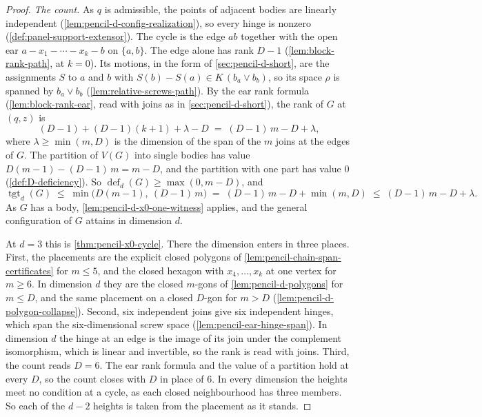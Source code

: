 \begin{proof}
  \emph{The count.} As $q$ is admissible, the points of adjacent bodies
  are linearly independent (\cref{lem:pencil-d-config-realization}), so
  every hinge is nonzero (\cref{def:panel-support-extensor}). The cycle
  is the edge $ab$ together with the open ear
  $a - x_1 - \cdots - x_k - b$ on $\{a, b\}$. The edge alone has rank
  $D - 1$ (\cref{lem:block-rank-path}, at $k = 0$). Its motions, in the
  form of \cref{sec:pencil-d-short}, are the assignments $S$ to $a$ and
  $b$ with $S(b) - S(a) \in K\,(b_a \vee b_b)$, so its space $\rho$ is
  spanned by $b_a \vee b_b$ (\cref{lem:relative-screws-path}). By the
  ear rank formula (\cref{lem:block-rank-ear}, read with joins as in
  \cref{sec:pencil-d-short}), the rank of $G$ at $(q, z)$ is
  \[
    (D - 1) + (D - 1)(k + 1) + \lambda - D \;=\; (D - 1)\,m - D + \lambda,
  \]
  where $\lambda \ge \min(m, D)$ is the dimension of the span of the $m$
  joins at the edges of $G$. The partition of $V(G)$ into single bodies
  has value $D(m - 1) - (D - 1)\,m = m - D$, and the partition with one
  part has value $0$ (\cref{def:D-deficiency}). So
  $\operatorname{def}_d(G) \ge \max(0, m - D)$, and
  \[
    \operatorname{tgt}_d(G) \;\le\; \min\bigl(D(m - 1),\ (D - 1)\,m\bigr)
    \;=\; (D - 1)\,m - D + \min(m, D) \;\le\; (D - 1)\,m - D + \lambda.
  \]
  As $G$ has a body, \cref{lem:pencil-d-x0-one-witness} applies, and the
  general configuration of $G$ attains in dimension $d$.

  At $d = 3$ this is \cref{thm:pencil-x0-cycle}. There the dimension
  enters in three places. First, the placements are the explicit closed
  polygons of \cref{lem:pencil-chain-span-certificates} for $m \le 5$,
  and the closed hexagon with $x_4, \dots, x_k$ at one vertex for
  $m \ge 6$. In dimension $d$ they are the closed $m$-gons of
  \cref{lem:pencil-d-polygons} for $m \le D$, and the same placement on
  a closed $D$-gon for $m > D$ (\cref{lem:pencil-d-polygon-collapse}).
  Second, six independent joins give six independent hinges, which span
  the six-dimensional screw space (\cref{lem:pencil-ear-hinge-span}). In
  dimension $d$ the hinge at an edge is the image of its join under the
  complement isomorphism, which is linear and invertible, so the rank is
  read with joins. Third, the count reads $D = 6$. The ear rank formula
  and the value of a partition hold at every $D$, so the count closes
  with $D$ in place of $6$. In every dimension the heights meet no
  condition at a cycle, as each closed neighbourhood has three members.
  So each of the $d - 2$ heights is taken from the placement as it
  stands.
\end{proof}

